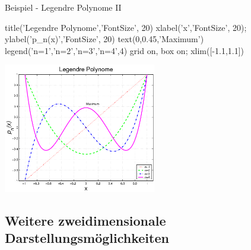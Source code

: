 \documentclass[hyperref={xetex}]{beamer}
\begin{document}
% 
% 
\begin{frame}[fragile]{Beispiel - Legendre Polynome II}
\begin{matlabin}[basicstyle=\scriptsize]
title('Legendre Polynome','FontSize', 20)
xlabel('x','FontSize', 20); ylabel('p_n(x)','FontSize', 20)
text(0,0.45,'Maximum')
legend('n=1','n=2','n=3','n=4',4)
grid on, box on;
xlim([-1.1,1.1])
\end{matlabin}
\hfil\includegraphics[width=0.5\textwidth]{figures/grafik_5}\hfil
\end{frame}
% 
% 


\subsection{Weitere zweidimensionale Darstellungsmöglichkeiten}
\end{document}
